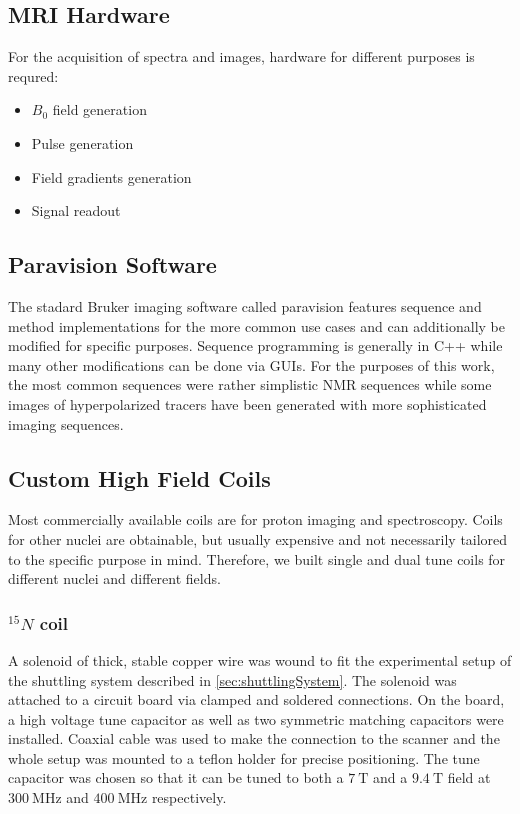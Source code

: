 		\subsection{MRI Hardware}
			For the acquisition of spectra and images, hardware for different purposes is requred:
			\begin{itemize}
			\item $B_0$ field generation
			\item Pulse generation
			\item Field gradients generation
			\item Signal readout
			\end{itemize}
		\subsection{Paravision Software}
			The stadard Bruker imaging software called paravision features sequence and method
			implementations for the more common use cases and can additionally be modified for
			specific purposes. Sequence programming is generally in C++ while many other
			modifications can be done via GUIs.
			For the purposes of this work, the most common sequences were rather simplistic NMR
			sequences while some images of hyperpolarized tracers have been generated with more
			sophisticated imaging sequences.
		\subsection{Custom High Field Coils}
			Most commercially available coils are for proton imaging and spectroscopy. Coils for
			other nuclei are obtainable, but usually expensive and not necessarily tailored to the
			specific purpose in mind. Therefore, we built single and dual tune coils for different
			nuclei and different fields.
			\subsubsection{$^{15}N$ coil}
				A solenoid of thick, stable copper wire was wound to fit the experimental setup of
				the shuttling system described in \ref{sec:shuttlingSystem}. The solenoid was
				attached to a circuit board via clamped and soldered connections. On the board, a
				high voltage tune capacitor as well as two symmetric matching capacitors were
				installed. Coaxial cable was used to make the connection to the scanner and the
				whole setup was mounted to a teflon holder for precise positioning.
				The tune capacitor was chosen so that it can be tuned to both a $\SI{7}{\tesla}$ and
				a $\SI{9.4}{\tesla}$ field at $\SI{300}{\MHz}$ and $\SI{400}{\MHz}$ respectively.
				
